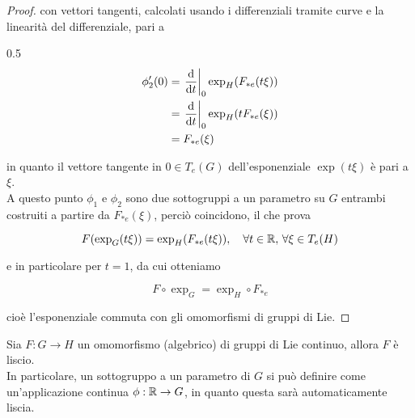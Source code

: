 \begin{proof}
	con vettori tangenti, calcolati usando i differenziali tramite curve e la linearità del differenziale, pari a
	
		{0.5}{%
				\begin{align}
					\begin{split}
						\phi'_{2}(0) &= \eval{ \dv{t} }_{0} \exp_{H}(F_{*e}(t \xi)) \\
						&= \eval{ \dv{t} }_{0} \exp_{H}(t F_{*e}(\xi)) \\
						&= F_{*e}(\xi)
					\end{split}
				\end{align}
				}
	
	in quanto il vettore tangente in $ 0 \in T_{e}(G) $ dell'esponenziale $ \exp(t \xi) $ è pari a $ \xi $.\\
	A questo punto $ \phi_{1} $ e $ \phi_{2} $ sono due sottogruppi a un parametro su $ G $ entrambi costruiti a partire da $ F_{*e}(\xi) $, perciò coincidono, il che prova
	
	\begin{equation}
		F(\exp_{G}(t \xi)) = \exp_{H}(F_{*e}(t \xi)) %
		\qcomma \forall t \in \R, \, \forall \xi \in T_{e}(H)
	\end{equation}

	e in particolare per $ t=1 $, da cui otteniamo
	
	\begin{equation}
		F \circ \exp_{G} = \exp_{H} \circ F_{*e}
	\end{equation}

	cioè l'esponenziale commuta con gli omomorfismi di gruppi di Lie.
\end{proof}

\begin{corollary}\label{om-cont-smooth}
	Sia $ F : G \to H $ un omomorfismo (algebrico) di gruppi di Lie continuo, allora $ F $ è liscio.\\
	In particolare, un sottogruppo a un parametro di $ G $ si può definire come un'applicazione continua $ \phi : \mathbb{R} \to G $, in quanto questa sarà automaticamente liscia.
\end{corollary}


